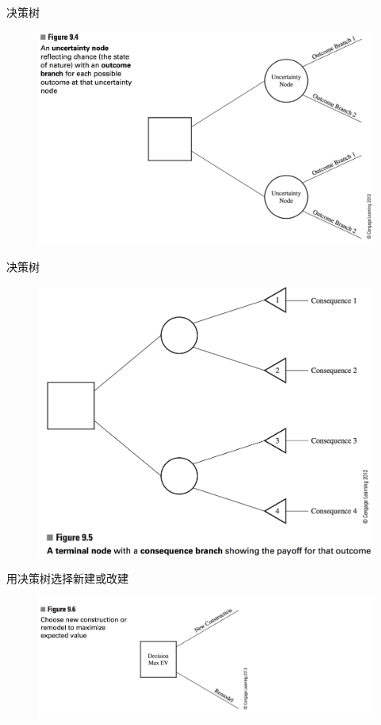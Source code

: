 \documentclass[UTF8]{ctexbeamer}
\begin{document}
\begin{frame}{决策树}
  
  \begin{figure}
    \centering
    \includegraphics[width=\textwidth{}]{9_4.png}
  \end{figure}
  
\end{frame}

\begin{frame}{决策树}
  
  \begin{figure}
    \centering
    \includegraphics[width=0.8\textwidth{}]{9_5.png}
  \end{figure}
  
\end{frame}

\begin{frame}{用决策树选择新建或改建}
  
  \begin{figure}
    \centering
    \includegraphics[width=\textwidth{}]{9_6.png}
  \end{figure}

\end{frame}
\end{document}

